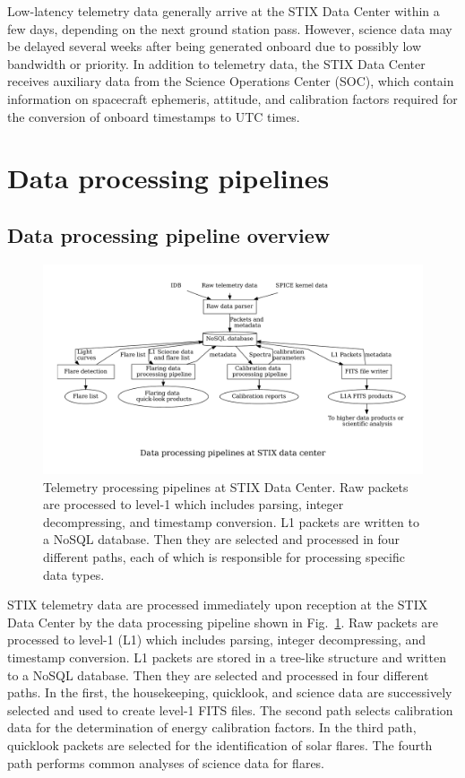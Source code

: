 \documentclass[referee]{aa} %
\begin{document}
Low-latency telemetry data generally arrive at the STIX Data Center within a few days, depending on the next ground station pass. However, science data may be delayed 
several weeks after being generated onboard due to possibly low bandwidth or priority.
In addition to telemetry data, the STIX Data Center receives auxiliary data \citep{spice1996,spice2018} from the Science Operations Center (SOC), which contain information on spacecraft ephemeris, attitude, and calibration factors required for the conversion of onboard timestamps to UTC times. 

\section{Data processing pipelines}
\subsection{Data processing pipeline overview}

\begin{figure}
    \centering
    \includegraphics[width=0.9\linewidth]{figures/pipelines.pdf}
    \caption{Telemetry processing pipelines at STIX Data Center. Raw packets are processed to
level-1 which includes parsing, integer decompressing, and timestamp conversion. L1 packets are written to a NoSQL database. Then they are selected and processed in four different paths, each of which is responsible for processing specific data types.    }
    \label{fig:main_pipelines}
\end{figure}
STIX telemetry data are processed immediately upon reception at the STIX Data Center by the data processing pipeline  
shown in Fig.~\ref{fig:main_pipelines}.  Raw packets are processed to
level-1 (L1) which includes parsing, integer decompressing, and timestamp conversion. 
L1 packets are stored in a tree-like structure and written to a NoSQL database. Then they are selected and processed in four different paths. 
In the first, the housekeeping, quicklook, and science data are successively selected and used to create level-1 FITS files. 
The second path selects calibration data for the determination of energy calibration factors.   
In the third path, quicklook packets are selected for the identification of solar flares. 
The fourth path performs common analyses of science data for flares.
\end{document}
